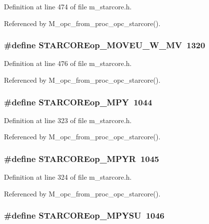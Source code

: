 Definition at line 474 of file m\_\-starcore.h.

Referenced by M\_\-opc\_\-from\_\-proc\_\-opc\_\-starcore().
\subsubsection{\setlength{\rightskip}{0pt plus 5cm}\#define STARCOREop\_\-MOVEU\_\-W\_\-MV~1320}\label{m__starcore_8h_94b7196102ccd694f7978ae9927d429e}




Definition at line 476 of file m\_\-starcore.h.

Referenced by M\_\-opc\_\-from\_\-proc\_\-opc\_\-starcore().
\subsubsection{\setlength{\rightskip}{0pt plus 5cm}\#define STARCOREop\_\-MPY~1044}\label{m__starcore_8h_2fc3c1b903abb8f2e32c38ba061922f0}




Definition at line 323 of file m\_\-starcore.h.

Referenced by M\_\-opc\_\-from\_\-proc\_\-opc\_\-starcore().
\subsubsection{\setlength{\rightskip}{0pt plus 5cm}\#define STARCOREop\_\-MPYR~1045}\label{m__starcore_8h_1cb1ad0344be525b20d8ff1f8f945dd2}




Definition at line 324 of file m\_\-starcore.h.

Referenced by M\_\-opc\_\-from\_\-proc\_\-opc\_\-starcore().
\subsubsection{\setlength{\rightskip}{0pt plus 5cm}\#define STARCOREop\_\-MPYSU~1046}\label{m__starcore_8h_e80b575d28e47ff0ba047f25b3f4ba64}




